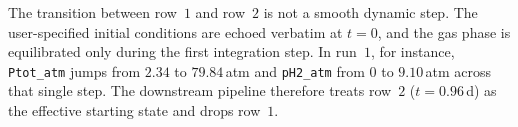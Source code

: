 The transition between row~$1$ and row~$2$ is not a smooth dynamic
step. The user-specified initial conditions are echoed verbatim at
$t = 0$, and the gas phase is equilibrated only during the first
integration step. In run~$1$, for instance, \texttt{Ptot\_atm} jumps
from $2.34$ to $79.84$\,atm and \texttt{pH2\_atm} from $0$ to
$9.10$\,atm across that single step. The downstream pipeline
therefore treats row~$2$ ($t = 0.96$\,d) as the effective starting
state and drops row~$1$.

